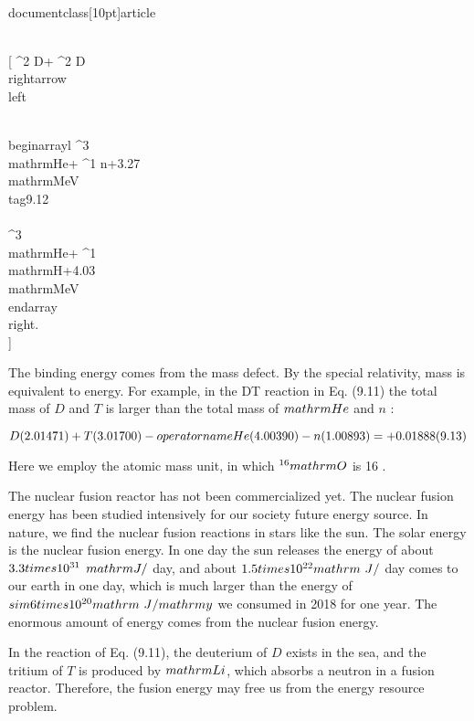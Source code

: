 \\documentclass[10pt]{article}
\begin{document}
{{{{{\\[
{ }^{2} D+{ }^{2} D \\rightarrow\\left\\{\\begin{array}{l}
{ }^{3} \\mathrm{He}+{ }^{1} n+3.27 \\mathrm{MeV}  \\tag{9.12}\\\\
{ }^{3} \\mathrm{He}+{ }^{1} \\mathrm{H}+4.03 \\mathrm{MeV}
\\end{array}\\right.
\\]

The binding energy comes from the mass defect. By the special relativity, mass is equivalent to energy. For example, in the DT reaction in Eq. (9.11) the total mass of $D$ and $T$ is larger than the total mass of $\\mathrm{He}$ and $n$ :

$$
D(2.01471)+T(3.01700)-\\operatorname{He}(4.00390)-n(1.00893)=+0.01888(9.13)
$$

Here we employ the atomic mass unit, in which ${ }^{16} \\mathrm{O}$ is 16 .

The nuclear fusion reactor has not been commercialized yet. The nuclear fusion energy has been studied intensively for our society future energy source. In nature, we find the nuclear fusion reactions in stars like the sun. The solar energy is the nuclear fusion energy. In one day the sun releases the energy of about $3.3 \\times 10^{31}$ $\\mathrm{J} /$ day, and about $1.5 \\times 10^{22} \\mathrm{~J} /$ day comes to our earth in one day, which is much larger than the energy of $\\sim 6 \\times 10^{20} \\mathrm{~J} / \\mathrm{y}$ we consumed in 2018 for one year. The enormous amount of energy comes from the nuclear fusion energy.

In the reaction of Eq. (9.11), the deuterium of $D$ exists in the sea, and the tritium of $T$ is produced by $\\mathrm{Li}$, which absorbs a neutron in a fusion reactor. Therefore, the fusion energy may free us from the energy resource problem.

}}}}}}
\end{document}
